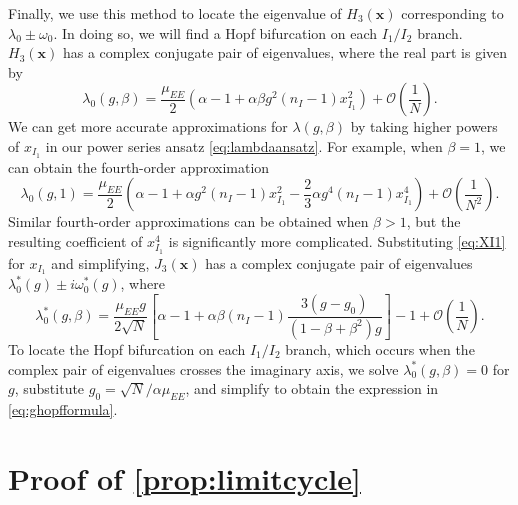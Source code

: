 \documentclass[reqno]{siamonline190516}
\newcommand{\xvec}{\mathbf{x}}
\begin{document}
Finally, we use this method to locate the eigenvalue of $H_3(\xvec)$ corresponding to $\lambda_0 \pm \omega_0$. In doing so, we will find a Hopf bifurcation on each $I_1/I_2$ branch. $H_3(\xvec)$ has a complex conjugate pair of eigenvalues, where the real part is given by
\begin{equation}
\lambda_0(g, \beta) = \frac{\mu_{EE}}{2}\left( \alpha - 1 + \alpha \beta g^2 (n_I-1) x_{I_1}^2 \right) + \mathcal{O}\left(\frac{1}{N} \right).
\end{equation}
We can get more accurate approximations for $\lambda(g, \beta)$ by taking higher powers of $x_{I_1}$ in our power series ansatz \cref{eq:lambdaansatz}. For example, when $\beta=1$, we can obtain the fourth-order approximation
\[
\lambda_0(g, 1) = \frac{\mu_{EE}}{2}\left( \alpha - 1 + \alpha g^2 (n_I-1) x_{I_1}^2 - \frac{2}{3}\alpha g^4 (n_I-1) x_{I_1}^4 \right) + \mathcal{O}\left(\frac{1}{N^2} \right).
\]
Similar fourth-order approximations can be obtained when $\beta>1$, but the resulting coefficient of $x_{I_1}^4$ is significantly more complicated.
Substituting \cref{eq:XI1} for $x_{I_1}$ and simplifying, $J_3(\xvec)$ has a complex conjugate pair of eigenvalues $\lambda_0^*(g) \pm i \omega_0^*(g)$, where
\begin{equation}\label{eq:lambdagbeta}
\lambda_0^*(g, \beta) = \frac{\mu_{EE} g}{2 \sqrt{N}}\left[ \alpha - 1 + \alpha \beta (n_I-1) \frac{ 3(g - g_0) }{ (1 - \beta + \beta^2 )g} \right] - 1 + \mathcal{O}\left(\frac{1}{N} \right).
\end{equation}
To locate the Hopf bifurcation on each $I_1/I_2$ branch, which occurs when the complex pair of eigenvalues crosses the imaginary axis, we solve $\lambda_0^*(g, \beta) = 0$ for $g$, substitute $g_0 = \sqrt{N}/\alpha \mu_{EE}$, and simplify to obtain the expression in \cref{eq:ghopfformula}.

\section{Proof of \texorpdfstring{\cref{prop:limitcycle}}{Proposition}} \label{sec:limitcycleproof}
\end{document}
